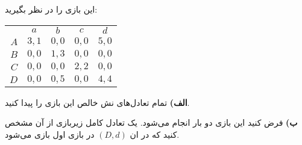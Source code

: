 این بازی را در نظر بگیرید:
\LTR 
\begin{latin}
    \begin{center}
        \begin{tabular}{r | c | c | c | c |}
            \multicolumn{1}{r}{} &
            \multicolumn{1}{c}{$a$} &
            \multicolumn{1}{c}{$b$} &
            \multicolumn{1}{c}{$c$} &
            \multicolumn{1}{c}{$d$} \\ \cline{2-5}
            $A$       & $3,1$   & $0,0$     & $0,0$  & $5,0$  \\ \cline{2-5}
            $B$       & $0,0$   & $1,3$     & $0,0$  & $0,0$  \\ \cline{2-5}
            $C$       & $0,0$   & $0,0$     & $2,2$  & $0,0$  \\ \cline{2-5}
            $D$       & $0,0$   & $0,5$     & $0,0$  & $4,4$  \\ \cline{2-5}
        \end{tabular}
    \end{center}
\end{latin}
\RTL

\textbf{الف)}
تمام تعادل‌های نش خالص این بازی را پیدا کنید.

\vspace*{5pt}
\textbf{ب)}
فرض کنید این بازی دو بار انجام می‌شود. یک تعادل کامل زیربازی از آن مشخص کنید که در ان
$(D,d)$
در بازی اول بازی می‌شود.